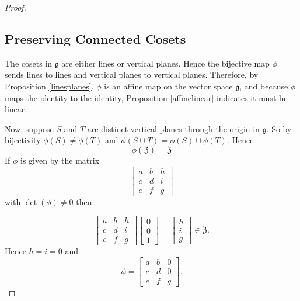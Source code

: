\documentclass[honours]{UNSWthesis}
\newcommand{\g}{\mathfrak{g}}
\newcommand{\1}{\mathbf{e}_{1}}
\newcommand{\2}{\mathbf{e}_{3}}
\newcommand{\3}{\mathbf{e}_{3}}
\begin{document}
\begin{proof}
\subsection{Preserving Connected Cosets}
The cosets in $\g$ are either lines or vertical planes. Hence the bijective map $\phi$ sends lines to lines and vertical planes to vertical planes. Therefore, by Proposition \ref{linesplanes}, $\phi$ is an affine map on the vector space $\g$, and because $\phi$ maps the identity to the identity, Proposition \ref{affinelinear} indicates it must be linear.


Now, suppose $S$ and $T$ are distinct vertical planes through the origin in $\g$. So by bijectivity $\phi(S) \neq \phi(T)$ and $\phi(S \cup T)=\phi(S) \cup \phi(T)$. Hence 
\[
\phi(\mathfrak{Z})=\mathfrak{Z}
\]
If $\phi$ is given by the matrix 
$$\begin{bmatrix}
a & b & h \\
c & d & i \\
e & f & g
\end{bmatrix}
$$ with $\det(\phi) \neq 0$ then 

\[
\begin{bmatrix}
a & b & h \\
c & d & i \\
e & f & g
\end{bmatrix} 
\begin{bmatrix}
0 \\ 0 \\ 1
\end{bmatrix} =
\begin{bmatrix}
h \\ i \\ g
\end{bmatrix} 
\in \mathfrak{Z}.
\]
Hence $h=i=0$ and 
\[
\phi=
\begin{bmatrix}
a & b & 0 \\
c & d & 0 \\
e & f & g
\end{bmatrix}.
\]

\end{proof}



\end{document}
